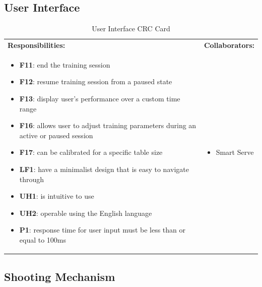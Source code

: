 \documentclass[11pt]{article}
\begin{document}
\subsection{User Interface}

\begin{table}[H]
\centering
\label{my-label}
\begin{tabular}{ | >{\raggedright\arraybackslash}p{} | >{\raggedright\arraybackslash}p{} | }
\hline
\multicolumn{2}{|c|}{\textbf{Smart Serve}}             \\ \hline
\textbf{Responsibilities:} & \textbf{Collaborators:} \\ \hline
\begin{itemize}
\item \textbf{F11}: end the training session
\item \textbf{F12}: resume training session from a paused state
\item \textbf{F13}: display user's performance over a custom time range
\item \textbf{F16}: allows user to adjust training parameters during an active or paused session
\item \textbf{F17}: can be calibrated for a specific table size
\item \textbf{LF1}: have a minimalist design that is easy to navigate through
\item \textbf{UH1}: is intuitive to use
\item \textbf{UH2}: operable using the English language
\item \textbf{P1}: response time for user input must be less than or equal to 100ms
\end{itemize}
&
\begin{itemize}
\item Smart Serve
\end{itemize} \\ \hline
\end{tabular}
\caption{User Interface CRC Card}
\end{table}

\subsection{Shooting Mechanism}
\end{document}
